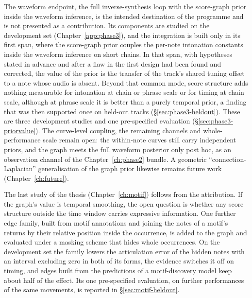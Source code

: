 The waveform endpoint, the full inverse-synthesis loop with the score-graph
prior inside the waveform inference, is the intended destination of the
programme and is not presented as a contribution. Its components are
studied on the development set (Chapter~\ref{app:phase3}), and the
integration is built only in its first span, where the score-graph prior
couples the per-note intonation constants inside the waveform inference on
short chains. In that span, with hypotheses stated in advance and after a
flaw in the first design had been found and corrected, the value of the
prior is the transfer of the track's shared tuning offset to a note whose
audio is absent. Beyond that common mode, score structure adds nothing
measurable for intonation at chain or phrase scale or for timing at chain
scale, although at phrase scale it is better than a purely temporal prior,
a finding that was then supported once on held-out tracks
(\S\ref{sec:phase3-heldout}). These are three development studies and one
pre-specified evaluation (\S\ref{sec:phase3-priorvalue}). The curve-level coupling, the remaining
channels and whole-performance scale remain open: the within-note curves
still carry independent priors, and the graph meets the full waveform
posterior only post hoc, as an observation channel of the
Chapter~\ref{ch:phase2} bundle. A geometric ``connection-Laplacian''
generalisation of the graph prior likewise remains future work
(Chapter~\ref{ch:future}).

The last study of the thesis (Chapter~\ref{ch:motif}) follows from the
attribution. If the graph's value is temporal smoothing, the open question
is whether any score structure outside the time window carries expressive
information. One further edge family, built from motif annotations and
joining the notes of a motif's returns by their relative position inside
the occurrence, is added to the graph and evaluated under a masking scheme
that hides whole occurrences. On the development set the family lowers the
articulation error of the hidden notes with an interval excluding zero in
both of its forms, the evidence switches it off on timing, and edges built
from the predictions of a motif-discovery model keep about half of the
effect. Its one pre-specified evaluation, on further performances of the
same movements, is reported in \S\ref{sec:motif-heldout}.


